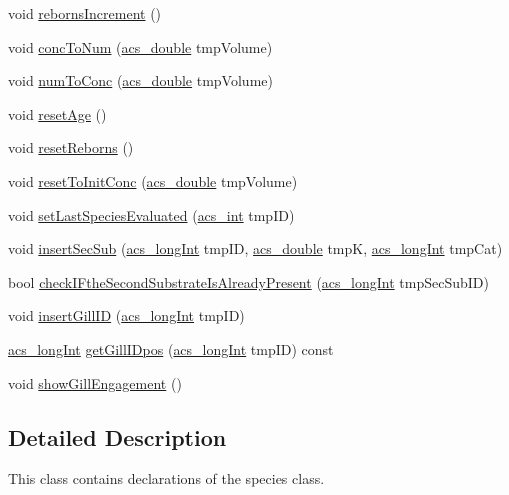 \begin{DoxyCompactItemize}
\item 
void \hyperlink{a00016_a90d5fc1d90637f2245e8b0ecf228ddfa}{reborns\-Increment} ()
\item 
void \hyperlink{a00016_a9842732a5dbe0eb67e24148b5d7ae4a2}{conc\-To\-Num} (\hyperlink{a00066_ab776853a005fcbf56af0424a2a4dd607}{acs\-\_\-double} tmp\-Volume)
\item 
void \hyperlink{a00016_a23c19a53390142ba690d0f3db0520d05}{num\-To\-Conc} (\hyperlink{a00066_ab776853a005fcbf56af0424a2a4dd607}{acs\-\_\-double} tmp\-Volume)
\item 
void \hyperlink{a00016_a911d4db36e84690d19abb2902a734524}{reset\-Age} ()
\item 
void \hyperlink{a00016_a4884d8bce59ddb79e87e08f3ed16633f}{reset\-Reborns} ()
\item 
void \hyperlink{a00016_acc180a103e6681da2add266aafda3eb9}{reset\-To\-Init\-Conc} (\hyperlink{a00066_ab776853a005fcbf56af0424a2a4dd607}{acs\-\_\-double} tmp\-Volume)
\item 
void \hyperlink{a00016_a8daa007da55f042b9c436f956836f4d8}{set\-Last\-Species\-Evaluated} (\hyperlink{a00066_a8d277355641a098190360234e2ebde35}{acs\-\_\-int} tmp\-I\-D)
\item 
void \hyperlink{a00016_a0da8d53a216583f7790b12362da376a3}{insert\-Sec\-Sub} (\hyperlink{a00066_a19319d75f02db4308bc5c0026d98cd85}{acs\-\_\-long\-Int} tmp\-I\-D, \hyperlink{a00066_ab776853a005fcbf56af0424a2a4dd607}{acs\-\_\-double} tmp\-K, \hyperlink{a00066_a19319d75f02db4308bc5c0026d98cd85}{acs\-\_\-long\-Int} tmp\-Cat)
\item 
bool \hyperlink{a00016_af04a95fb2b35bf988271a60413ec508e}{check\-I\-Fthe\-Second\-Substrate\-Is\-Already\-Present} (\hyperlink{a00066_a19319d75f02db4308bc5c0026d98cd85}{acs\-\_\-long\-Int} tmp\-Sec\-Sub\-I\-D)
\item 
void \hyperlink{a00016_aeca516fc712a2bfa19ec560961ed03f7}{insert\-Gill\-I\-D} (\hyperlink{a00066_a19319d75f02db4308bc5c0026d98cd85}{acs\-\_\-long\-Int} tmp\-I\-D)
\item 
\hyperlink{a00066_a19319d75f02db4308bc5c0026d98cd85}{acs\-\_\-long\-Int} \hyperlink{a00016_a1a5c93a3fd5a2605d5e2fd14d29b97cd}{get\-Gill\-I\-Dpos} (\hyperlink{a00066_a19319d75f02db4308bc5c0026d98cd85}{acs\-\_\-long\-Int} tmp\-I\-D) const 
\item 
void \hyperlink{a00016_a211914e1702d47eb3203730fec2c7b4c}{show\-Gill\-Engagement} ()
\end{DoxyCompactItemize}


\subsection{Detailed Description}
This class contains declarations of the species class. 

